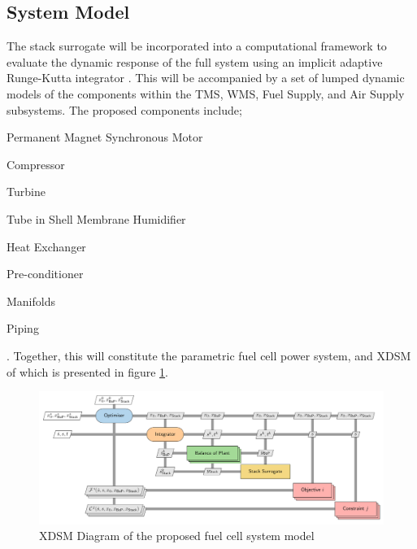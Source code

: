 \subsection{System Model}

The stack surrogate will be incorporated into a computational framework to evaluate the dynamic response of the full system using an implicit adaptive Runge-Kutta integrator \cite{SolvingOrdinaryDifferential}.
This will be accompanied by a set of lumped dynamic models of the components within the TMS, WMS, Fuel Supply, and Air Supply subsystems.
The proposed components include; \begin{enumerate*} 	\item Permanent Magnet Synchronous Motor
	\item Compressor
	\item Turbine
	\item Tube in Shell Membrane Humidifier
	\item Heat Exchanger
	\item Pre-conditioner
	\item Manifolds
	\item Piping
\end{enumerate*}. Together, this will constitute the parametric fuel cell power system, and XDSM of which is presented  in figure \ref{fig:xdsm}.
\begin{center}
	\begin{figure}
		\includegraphics[width=\linewidth]{figures/xdsm.pdf}
		\caption{XDSM Diagram of the proposed fuel cell system model}
		\label{fig:xdsm}
	\end{figure}
\end{center}

